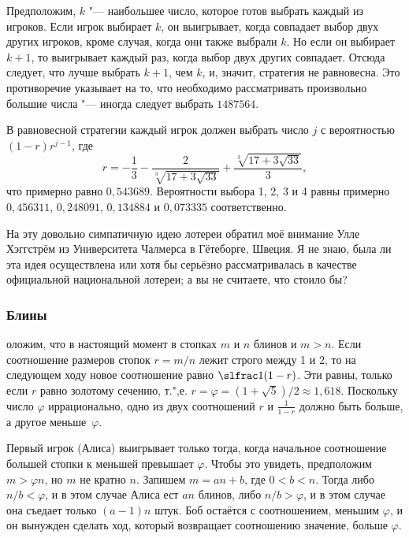 \documentclass[twoside]{book}
\begin{document}
Предположим,  $k$ "--- наибольшее число, которое готов выбрать каждый из игроков.
Если игрок выбирает $k$, он выигрывает, когда совпадает выбор двух других игроков, кроме случая, когда они также выбрали $k$.
Но если он выбирает $k+1$, то выигрывает каждый раз, когда выбор двух других совпадает.
Отсюда следует, что лучше выбрать $k+1$, чем $k$, и, значит, стратегия не равновесна.
Это противоречие указывает на то, что необходимо рассматривать произвольно большие числа "--- иногда следует выбрать $1487564$.
\heart

В равновесной стратегии каждый игрок должен выбрать число $j$ с вероятностью $(1-r)r^{j-1}$, где\vspace {-\jot}
\[r = -\frac13-\frac2{\sqrt[3]{17+3\sqrt{33}}}+\frac{\sqrt[3]{17+3\sqrt{33}}}3,\]
что примерно равно $0{,}543689$.
Вероятности выбора  1, 2, 3 и 4 равны примерно $0{,}456311$, $0{,}248091$, $0{,}134884$ и $0{,}073335$ соответственно.

На эту довольно симпатичную идею лотереи обратил моё внимание Улле Хэггстрём из Университета Чалмерса в Гётеборге, Швеция. %
Я не знаю, была ли эта идея осуществлена или хотя бы серьёзно рассматривалась в качестве официальной национальной лотереи; а вы не считаете, что стоило бы?

\subsubsection*{Блины}%

оложим, что в настоящий момент в стопках $m$ и $n$ блинов и $m > n$.
Если соотношение размеров стопок $r = m/n$ лежит строго между 1 и 2, то на следующем ходу новое соотношение равно $\slfrac1{(1-r)}$.
Эти  равны, только если $r$ равно золотому сечению,
т.",е. $r=\varphi=(1+\sqrt{5})/2\approx 1{,}618$.
Поскольку число $\varphi$ иррационально, одно из двух соотношений $r$ и $\tfrac1{1-r}$ должно быть больше, а другое меньше~$\varphi$.

Первый игрок (Алиса) выигрывает только тогда, когда начальное соотношение большей стопки к меньшей превышает $\varphi$.
Чтобы это увидеть, предположим $m>\varphi n$, но $m$ не кратно $n$.
Запишем $m=an+b$, где $0<b<n$.
Тогда либо $n/b<\varphi$, и в этом случае Алиса ест $an$ блинов, либо $n/b>\varphi$, и в этом случае она съедает только $(a-1)n$ штук.
Боб остаётся с соотношением, меньшим $\varphi$, и он вынужден сделать ход, который возвращает соотношению значение, больше $\varphi$.
\end{document}
